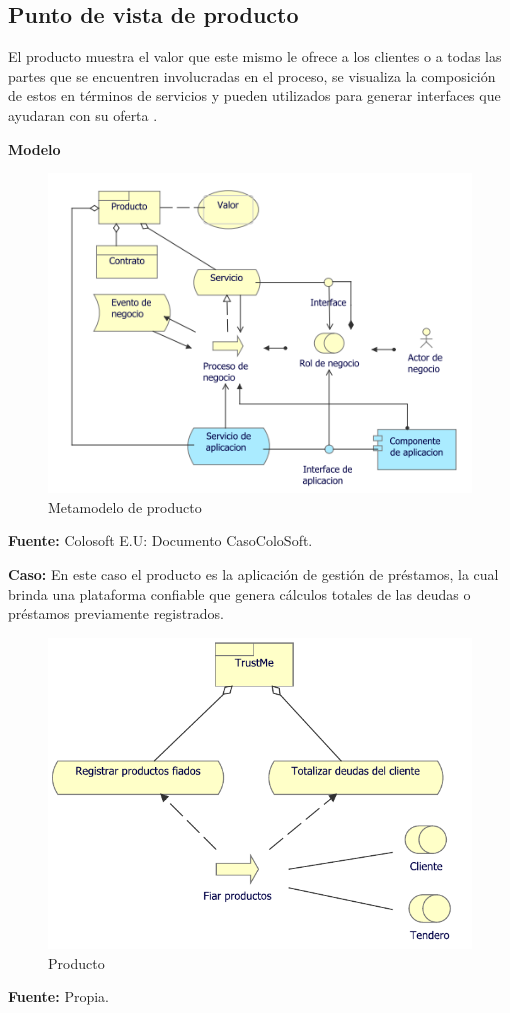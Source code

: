 	\subsection{Punto de vista de producto}
	{ El producto muestra el valor que este mismo le ofrece a los clientes o a todas las partes que se encuentren involucradas en el proceso, se visualiza la composición de estos en términos de servicios y pueden utilizados para generar interfaces que ayudaran con su oferta \cite{archimate}.\\
	\newpage
		
		\textbf{Modelo}\\
		\begin{figure}[H]
			\centering
			\includegraphics[width=0.8\linewidth]{development/producto.png}
			\caption{Metamodelo de producto}
		\end{figure}
		\begin{center}
			\textbf{Fuente:} Colosoft E.U: Documento CasoColoSoft.
		\end{center}
		\hfill \break
		
		\textbf{Caso:} En este caso el producto es la aplicación de gestión de préstamos, la cual brinda una plataforma confiable que genera cálculos totales de las deudas o préstamos previamente registrados.
	
		
		\begin{figure}[H]
			\centering
			\includegraphics[width=0.8\linewidth]{development/producto.pdf}
			\caption{Producto}
		\end{figure}
		\begin{center}
			\textbf{Fuente:} Propia.
		\end{center}
	}
